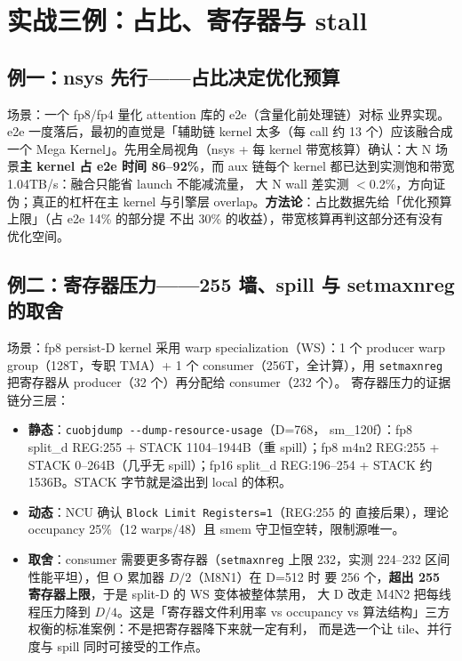 \section{实战三例：占比、寄存器与 stall}\label{sec:ch00-cases}

\subsection{例一：nsys 先行——占比决定优化预算}

场景：一个 fp8/fp4 量化 attention 库的 e2e（含量化前处理链）对标
业界实现。e2e 一度落后，最初的直觉是「辅助链 kernel 太多（每 call
约 13 个）应该融合成一个 Mega Kernel」。先用全局视角（nsys + 每 kernel
带宽核算）确认：大 N 场景\textbf{主 kernel 占 e2e 时间 86--92\%}，而 aux
链每个 kernel 都已达到实测饱和带宽 1.04TB/s：融合只能省 launch 不能减流量，
大 N wall 差实测 $<$0.2\%，方向证伪；真正的杠杆在主 kernel 与引擎层
overlap。\textbf{方法论}：占比数据先给「优化预算上限」（占 e2e 14\% 的部分提
不出 30\% 的收益），带宽核算再判这部分还有没有优化空间。

\subsection{例二：寄存器压力——255 墙、spill 与 setmaxnreg 的取舍}

场景：fp8 persist-D kernel 采用 warp specialization（WS）：1 个 producer
warp group（128T，专职 TMA）+ 1 个 consumer（256T，全计算），用
\texttt{setmaxnreg} 把寄存器从 producer（32 个）再分配给 consumer（232 个）。
寄存器压力的证据链分三层：

\begin{itemize}
\item \textbf{静态}：\texttt{cuobjdump -{}-dump-resource-usage}（D=768，
  sm\_120f）：fp8 split\_d REG:255 + STACK 1104--1944B（重 spill）；fp8
  m4n2 REG:255 + STACK 0--264B（几乎无 spill）；fp16 split\_d REG:196--254
  + STACK 约 1536B。STACK 字节就是溢出到 local 的体积。
\item \textbf{动态}：NCU 确认 \texttt{Block Limit Registers=1}（REG:255 的
  直接后果），理论 occupancy 25\%（12 warps/48）且 smem 守卫恒空转，限制源唯一。
\item \textbf{取舍}：consumer 需要更多寄存器（\texttt{setmaxnreg} 上限
  232，实测 224--232 区间性能平坦），但 O 累加器 $D/2$（M8N1）在 D=512 时
  要 256 个，\textbf{超出 255 寄存器上限}，于是 split-D 的 WS 变体被整体禁用，
  大 D 改走 M4N2 把每线程压力降到 $D/4$。这是「寄存器文件利用率 vs
  occupancy vs 算法结构」三方权衡的标准案例：不是把寄存器降下来就一定有利，
  而是选一个让 tile、并行度与 spill 同时可接受的工作点。
\end{itemize}

